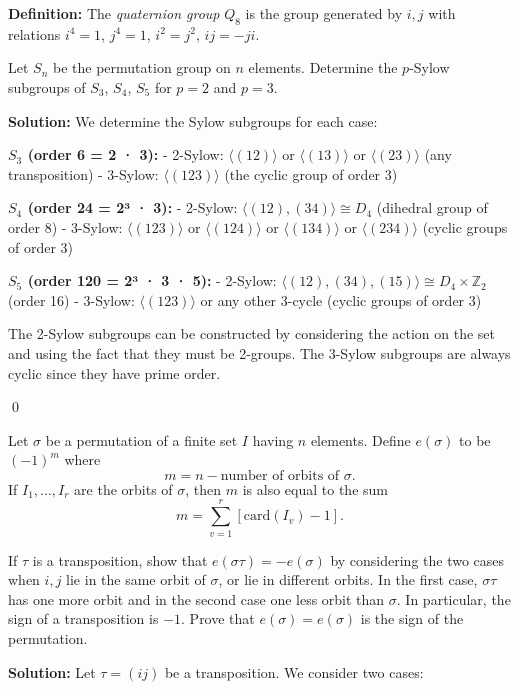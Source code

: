\textbf{Definition:} The \textit{quaternion group} $Q_8$ is the group generated by $i, j$ with relations $i^4 = 1$, $j^4 = 1$, $i^2 = j^2$, $ij = -ji$.

\begin{problembox}
Let $S_n$ be the permutation group on $n$ elements. Determine the $p$-Sylow subgroups of $S_3$, $S_4$, $S_5$ for $p = 2$ and $p = 3$.
\end{problembox}

\noindent\textbf{Solution:} We determine the Sylow subgroups for each case:

\textbf{$S_3$ (order 6 = 2 · 3):}
- 2-Sylow: $\langle (12) \rangle$ or $\langle (13) \rangle$ or $\langle (23) \rangle$ (any transposition)
- 3-Sylow: $\langle (123) \rangle$ (the cyclic group of order 3)

\textbf{$S_4$ (order 24 = 2³ · 3):}
- 2-Sylow: $\langle (12), (34) \rangle \cong D_4$ (dihedral group of order 8)
- 3-Sylow: $\langle (123) \rangle$ or $\langle (124) \rangle$ or $\langle (134) \rangle$ or $\langle (234) \rangle$ (cyclic groups of order 3)

\textbf{$S_5$ (order 120 = 2³ · 3 · 5):}
- 2-Sylow: $\langle (12), (34), (15) \rangle \cong D_4 \times \mathbb{Z}_2$ (order 16)
- 3-Sylow: $\langle (123) \rangle$ or any other 3-cycle (cyclic groups of order 3)

The 2-Sylow subgroups can be constructed by considering the action on the set and using the fact that they must be 2-groups. The 3-Sylow subgroups are always cyclic since they have prime order.


\qed
\begin{problembox}
Let $\sigma$ be a permutation of a finite set $I$ having $n$ elements. Define $e(\sigma)$ to be $(-1)^m$ where
\[m = n - \text{number of orbits of } \sigma.\]
If $I_1, \ldots, I_r$ are the orbits of $\sigma$, then $m$ is also equal to the sum
\[m = \sum_{v=1}^r [\text{card}(I_v) - 1].\]

If $\tau$ is a transposition, show that $e(\sigma\tau) = -e(\sigma)$ by considering the two cases when $i, j$ lie in the same orbit of $\sigma$, or lie in different orbits. In the first case, $\sigma\tau$ has one more orbit and in the second case one less orbit than $\sigma$. In particular, the sign of a transposition is $-1$. Prove that $e(\sigma) = e(\sigma)$ is the sign of the permutation.
\end{problembox}

\noindent\textbf{Solution:} Let $\tau = (ij)$ be a transposition. We consider two cases:

